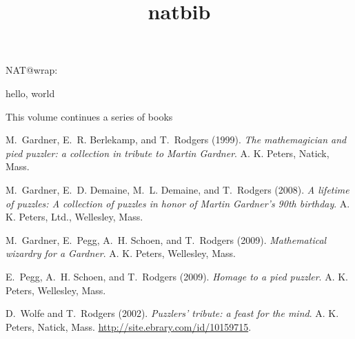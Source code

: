\documentclass{maabook}
\title{natbib}
\begin{document}
\maketitle

NAT@wrap: {\tt\makeatletter\meaning\@ifx}

hello, world


This volume continues a series of books \citep{Pegg2009, Wolfe2002,
  Gardner2008, Gardner2009, Gardner1999}

\begin{thebibliography}{5}

M.~Gardner, E.~R. Berlekamp, and T.~Rodgers (1999).
\emph{The mathemagician and pied puzzler: a collection in tribute to
  Martin Gardner}.
A. K. Peters, Natick, Mass.

M.~Gardner, E.~D. Demaine, M.~L. Demaine, and T.~Rodgers (2008).
\emph{A lifetime of puzzles: {A} collection of puzzles in honor of
  Martin Gardner's 90th birthday}.
A. K. Peters, Ltd., Wellesley, Mass.

M.~Gardner, E.~Pegg, A.~H. Schoen, and T.~Rodgers (2009).
\emph{Mathematical wizardry for a Gardner}.
A. K. Peters, Wellesley, Mass.

E.~Pegg, A.~H. Schoen, and T.~Rodgers (2009).
\emph{Homage to a pied puzzler}.
A. K. Peters, Wellesley, Mass.

D.~Wolfe and T.~Rodgers (2002).
\emph{Puzzlers' tribute: a feast for the mind}.
A. K. Peters, Natick, Mass.
\url{http://site.ebrary.com/id/10159715}.

\end{thebibliography}
\end{document}
